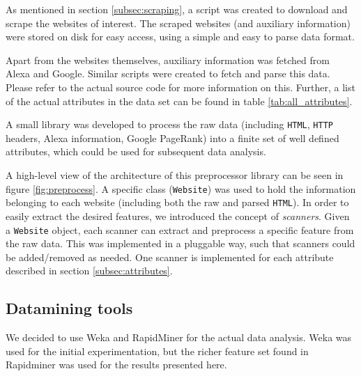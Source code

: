 
As mentioned in section \ref{subsec:scraping}, a script was created to download and scrape the websites of interest. The scraped websites (and auxiliary information) were stored on disk for easy access, using a simple and easy to parse data format.

Apart from the websites themselves, auxiliary information was fetched from Alexa and Google. Similar scripts were created to fetch and parse this data. Please refer to the actual source code for more information on this. Further, a list of the actual attributes in the data set can be found in table \ref{tab:all_attributes}.

A small library was developed to process the raw data (including \texttt{HTML}, \texttt{HTTP} headers, Alexa information, Google PageRank) into a finite set of well defined attributes, which could be used for subsequent data analysis.

A high-level view of the architecture of this preprocessor library can be seen in figure \ref{fig:preprocess}. A specific class (\texttt{Website}) was used to hold the information belonging to each website (including both the raw and parsed \texttt{HTML}). In order to easily extract the desired features, we introduced the concept of \textit{scanners}. Given a \texttt{Website} object, each scanner can extract and preprocess a specific feature from the raw data. This was implemented in a pluggable way, such that scanners could be added/removed as needed. One scanner is implemented for each attribute described in section \ref{subsec:attributes}.


\subsection{Datamining tools}
\label{subsec:weka}


We decided to use Weka and RapidMiner for the actual data analysis. Weka was used for the initial experimentation, but the richer feature set found in Rapidminer was used for the results presented here. 


